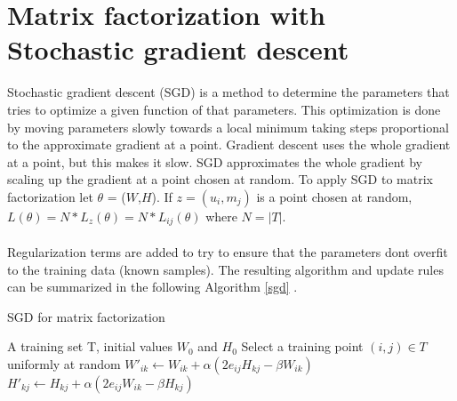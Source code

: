 \documentclass[a4paper,11pt]{article}
\begin{document}
\section{Matrix factorization with Stochastic gradient descent}
Stochastic gradient descent (SGD) is a method to determine the parameters that tries to optimize a given function of that parameters. This optimization is done by moving parameters slowly towards a local minimum taking steps proportional to the approximate gradient at a point. Gradient descent uses the whole gradient at a point, but this makes it slow. SGD approximates the whole gradient by scaling up the gradient at a point chosen at random. To apply SGD to matrix factorization let $\theta$ = ($W$,$H$). If $z=(u_i,m_j)$ is a point chosen at random, $L(\theta) = N*L_{z}(\theta) = N*L_{ij}(\theta)$ where $N = |T|$.\\\\
Regularization terms are added to try to ensure that the parameters dont overfit to the training data (known samples). The resulting algorithm and update rules can be summarized in the following Algorithm \ref{sgd} \cite{blogpost}.
\begin{algorithm}
\caption{SGD for matrix factorization}
\label{sgd}
\begin{algorithmic}[1]
\Require A training set T, initial values $W_0$ and $H_0$
\State Select a training point $(i,j)\in T$ uniformly at random
\State $ W'_{ik} \leftarrow W_{ik} + \alpha (2e_{ij}H_{kj} - \beta W_{ik}) $
\State $ H'_{kj} \leftarrow H_{kj} + \alpha (2e_{ij}W_{ik} - \beta H_{kj}) $
\EndWhile
\end{algorithmic}
\end{algorithm}
\end{document}
